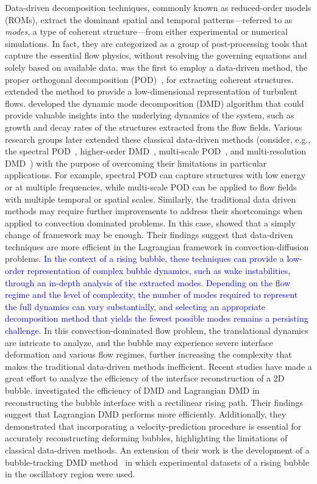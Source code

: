 \documentclass[a4paper,fleqn]{cas-sc}
\newcommand{\hl}[1]{\textcolor{blue}{#1}}
\newcommand{\hl}[1]{#1}
\begin{document}
	Data-driven decomposition techniques, commonly known as reduced-order models (ROMs), extract the dominant spatial and temporal patterns—referred to as \textit{modes}, a type of coherent structure—from either experimental or numerical simulations. In fact, they are categorized as a group of post-processing tools that capture the essential flow physics, without resolving the governing equations and solely based on available data. \citet{Lumley1967166} was the first to employ a data-driven method, the proper orthogonal decomposition (POD)~\cite{volkwein2013proper,Berkooz1993}, for extracting coherent structures. \citet{Holmes1996} extended the method to provide a low-dimensional representation of turbulent flows. \citet{SCHMID2010} developed the dynamic mode decomposition (DMD) algorithm that could provide valuable insights into the underlying dynamics of the system, such as growth and decay rates of the structures extracted from the flow fields. Various research groups later extended these classical data-driven methods (consider, e.g., the spectral POD~\cite{Towne2018}, higher-order DMD~\cite{LeClainche2017}, multi-scale POD~\cite{Mendez2019}, and multi-resolution DMD~\cite{Kutzz2016a}) with the purpose of overcoming their limitations in particular applications. For example, spectral POD can capture structures with low energy or at multiple frequencies, while multi-scale POD can be applied to flow fields with multiple temporal or spatial scales. Similarly, the traditional data driven methods may require further improvements to address their shortcomings when applied to convection dominated problems. In this case, \citet{Lu2020} showed that a simply change of framework may be enough. Their findings suggest that data-driven techniques are more efficient in the Lagrangian framework in convection-diffusion problems. \hl{In the context of a rising bubble, these techniques can provide a low-order representation of complex bubble dynamics, such as wake instabilities, through an in-depth analysis of the extracted modes. Depending on the flow regime and the level of complexity, the number of modes required to represent the full dynamics can vary substantially, and selecting an appropriate decomposition method that yields the fewest possible modes remains a persisting challenge.} In this convection-dominated flow problem, the translational dynamics are intricate to analyze, and the bubble may experience severe interface deformation and various flow regimes, further increasing the complexity that makes the traditional data-driven methods inefficient. Recent studies have made a great effort to analyze the efficiency of the interface reconstruction of a 2D bubble. \citet{Yin2023a} investigated the efficiency of DMD and Lagrangian DMD in reconstructing the bubble interface with a rectilinear rising path. Their findings suggest that Lagrangian DMD performs more efficiently. Additionally, they demonstrated that incorporating a velocity-prediction procedure is essential for accurately reconstructing deforming bubbles, highlighting the limitations of classical data-driven methods. An extension of their work is the development of a bubble-tracking DMD method~\cite{Yin2023} in which experimental datasets of a rising bubble in the oscillatory region were used. 
	
\end{document}
